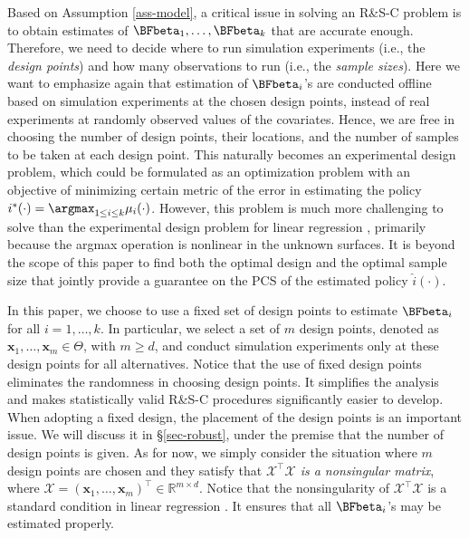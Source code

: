 \documentclass[ijoc,nonblindrev]{informs3}
\def\bx{{\bm x}}
\def\cX{{\mathcal X}}
\begin{document}
Based on Assumption \ref{ass-model}, a critical issue in solving an R\&S-C problem is to obtain estimates of $\BFbeta_1,\ldots,\BFbeta_k$ that are accurate enough.
Therefore, we need to decide where to run simulation experiments (i.e., the \textit{design points}) and how many observations to run (i.e., the \textit{sample sizes}).
Here we want to emphasize again that estimation of $\BFbeta_i$'s are conducted offline based on simulation experiments at the chosen design points, instead of real experiments at randomly observed values of the covariates.
Hence, we are free in choosing the number of design points, their locations, and the number of samples to be taken at each design point.
This naturally becomes an experimental design problem, which could be formulated as an optimization problem with an objective of  minimizing certain metric of the error in estimating the policy $i^*(\cdot)=\argmax_{1\leq i\leq k} \mu_i(\cdot)$.
However, this problem is much more challenging to solve than the experimental design problem for linear regression \citep{silvey1980optimal}, primarily because the argmax operation is nonlinear in the unknown surfaces.
It is beyond the scope of this paper to find both the optimal design and the optimal sample size that jointly provide a guarantee on the PCS of the estimated policy $\hat i(\cdot)$.


In this paper, we choose to use a fixed set of design points to estimate $\BFbeta_i$ for all $i=1,\ldots,k$.
In particular, we select a set of $m$ design points, denoted as $\bx_1, \ldots, \bx_m \in \Theta$, with $m\ge d$, and conduct simulation experiments only at these design points for all alternatives.
Notice that the use of fixed design points eliminates the randomness in choosing design points.
It simplifies the analysis and makes statistically valid R\&S-C procedures significantly easier to develop.
When adopting a fixed design, the placement of the design points is an important issue.
We will discuss it in \S \ref{sec-robust}, under the premise that the number of design points is given.
As for now, we simply consider the situation where $m$ design points are chosen and they satisfy that \textit{$\cX^\intercal \cX$ is a nonsingular matrix}, where $\cX = (\bx_1, \ldots, \bx_m)^\intercal \in \mathbb{R}^{m\times d}$.
Notice that the nonsingularity of $\cX^\intercal \cX$ is a standard condition in linear regression \citep{james2013}.
It ensures that all $\BFbeta_i$'s may be estimated properly.
\end{document}
